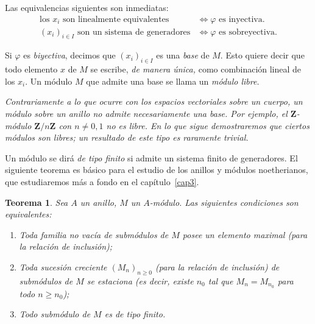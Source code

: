 \documentclass[oneside,bibtotoc,leqno,spanish]{amsbook}
\newcommand{\ZZ}{\mathbf{Z}}
\numberwithin{equation}{section}
\newenvironment{comm}%
	{\begin{trivlist}\item\small\itshape}
	{\end{trivlist}}
\theoremstyle{defi}
\theoremstyle{note}
\newtheorem{theorem}{Teorema}
\theoremstyle{rem}
\numberwithin{theorem}{section}
\numberwithin{proposition}{section}
\numberwithin{definition}{section}
\numberwithin{lemma}{section}
\numberwithin{corollary}{section}
\numberwithin{example}{section}
\numberwithin{footnote}{section}%
\begin{document}
Las equivalencias siguientes son inmediatas:
\begin{align}
\text{los $x_{i}$ son linealmente equivalentes} &\iff \text{$\varphi$ es inyectiva.}\\
\text{$(x_{i})_{i\in I}$ son un sistema de generadores} &\iff \text{$\varphi$ es sobreyectiva.}
\end{align}

Si $\varphi$ es {\em biyectiva}, decimos que $(x_{i})_{i\in I}$ es una {\em base}
de $M$. Esto quiere decir que
todo elemento $x$ de $M$ se escribe, {\em de manera \'unica,} como combinaci\'on lineal
de los $x_{i}$. Un m\'odulo
$M$ que admite una base se llama un {\em m\'odulo libre.}

\begin{comm}
Contrariamente a lo que ocurre con los espacios vectoriales sobre un cuerpo, un
m\'odulo sobre un
anillo no admite necesariamente una base. Por ejemplo, el $\ZZ$-m\'odulo $\ZZ/n\ZZ$
con $n\neq 0,1$
no es libre.
En lo que sigue demostraremos que ciertos m\'odulos son libres; un resultado de este
tipo es raramente trivial.
\end{comm}

Un m\'odulo se dir\'a {\em de tipo finito} si admite un sistema finito de
generadores. El siguiente teorema
es b\'asico para el estudio de los anillos y m\'odulos noetherianos, que estudiaremos
m\'as a fondo en el cap\'itulo~\ref{cap3}.

\begin{theorem}\label{teo1.4.1}
Sea $A$ un anillo, $M$ un $A$-m\'odulo. Las siguientes condiciones son equivalentes:
\begin{enumerate}
\item Toda familia no vac\'ia de subm\'odulos de $M$ posee un elemento maximal
(para la relaci\'on de inclusi\'on);
\item Toda sucesi\'on creciente $(M_{n})_{n\geq 0}$ (para la relaci\'on de inclusi\'on)
de subm\'odulos
de $M$ se estaciona (es decir, existe $n_{0}$ tal que $M_{n} = M_{n_{0}}$ para
todo $n\geq n_{0}$);
\item Todo subm\'odulo de $M$ es de tipo finito.
\end{enumerate}
\end{theorem}
\end{document}
